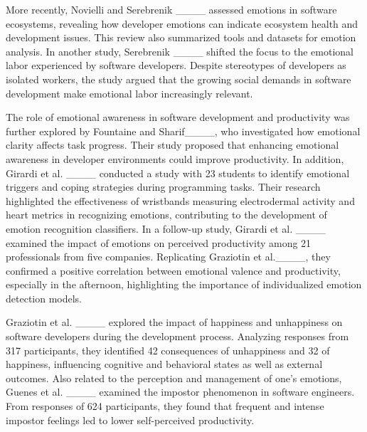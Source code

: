 More recently, Novielli and Serebrenik ____ assessed emotions in software ecosystems, revealing how developer emotions can indicate ecosystem health and development issues. This review also summarized tools and datasets for emotion analysis. In another study, Serebrenik ____ shifted the focus to the emotional labor experienced by software developers. Despite stereotypes of developers as isolated workers, the study argued that the growing social demands in software development make emotional labor increasingly relevant. 

The role of emotional awareness in software development and productivity was further explored by Fountaine and Sharif____, who investigated how emotional clarity affects task progress. Their study proposed that enhancing emotional awareness in developer environments could improve productivity. In addition, Girardi et al. ____ conducted a study with 23 students to identify emotional triggers and coping strategies during programming tasks. Their research highlighted the effectiveness of wristbands measuring electrodermal activity and heart metrics in recognizing emotions, contributing to the development of emotion recognition classifiers. In a follow-up study, Girardi et al. ____ examined the impact of emotions on perceived productivity among 21 professionals from five companies. Replicating Graziotin et al.____, they confirmed a positive correlation between emotional valence and productivity, especially in the afternoon, highlighting the importance of individualized emotion detection models.



Graziotin et al. ____ explored the impact of happiness and unhappiness on software developers during the development process. Analyzing responses from 317 participants, they identified 42 consequences of unhappiness and 32 of happiness, influencing cognitive and behavioral states as well as external outcomes. Also related to the perception and management of one's emotions, Guenes et al. ____ examined the impostor phenomenon in software engineers. From responses of 624 participants, they found that frequent and intense impostor feelings led to lower self-perceived productivity.

